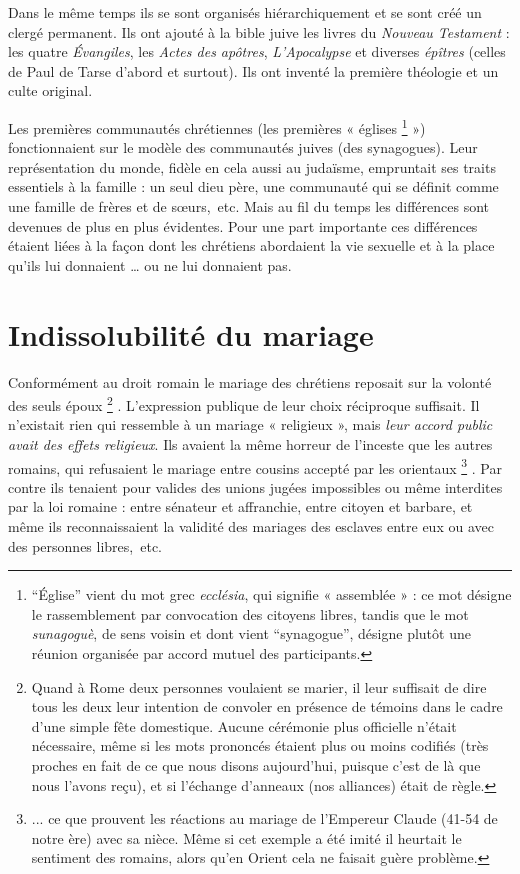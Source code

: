  Dans le même temps ils se sont organisés hiérarchiquement et se sont créé un clergé permanent. Ils ont ajouté à la bible juive les livres du \emph{Nouveau Testament} : les quatre \emph{Évangiles}, les \emph{Actes des apôtres}, \emph{L'Apocalypse} et diverses \emph{épîtres} (celles de Paul de Tarse d'abord et surtout). Ils ont inventé la première théologie et un culte original. 

 Les premières communautés chrétiennes (les premières « églises%
\footnote{\enquote{Église} vient du mot grec \emph{ecclésia}, qui signifie « assemblée » : ce mot désigne le rassemblement par convocation des citoyens libres, tandis que le mot \emph{sunagoguè}, de sens voisin et dont vient \enquote{synagogue}, désigne plutôt une réunion organisée par accord mutuel des participants.}
») fonctionnaient sur le modèle des communautés juives (des synagogues). Leur représentation du monde, fidèle en cela aussi au judaïsme, empruntait ses traits essentiels à la famille : un seul dieu père, une communauté qui se définit comme une famille de frères et de sœurs,~etc. Mais au fil du temps les différences sont devenues de plus en plus évidentes. Pour une part importante ces différences étaient liées à la façon dont les chrétiens abordaient la vie sexuelle et à la place qu'ils lui donnaient … ou ne lui donnaient pas. 


\section{Indissolubilité du mariage}

 Conformément au droit romain le mariage des chrétiens reposait sur la volonté des seuls époux%
\footnote{Quand à Rome deux personnes voulaient se marier, il leur suffisait de dire tous les deux leur intention de convoler en présence de témoins dans le cadre d'une simple fête domestique. Aucune cérémonie plus officielle n'était nécessaire, même si les mots prononcés étaient plus ou moins codifiés (très proches en fait de ce que nous disons aujourd'hui, puisque c'est de là que nous l'avons reçu), et si l'échange d'anneaux (nos alliances) était de règle.}%
. L'expression publique de leur choix réciproque suffisait. Il n'existait rien qui ressemble à un mariage « religieux », mais \emph{leur accord public avait des effets religieux}. Ils avaient la même horreur de l'inceste que les autres romains, qui refusaient le mariage entre cousins accepté par les orientaux%
\footnote{... ce que prouvent les réactions au mariage de l'Empereur Claude (41-54 de notre ère) avec sa nièce. Même si cet exemple a été imité il heurtait le sentiment des romains, alors qu'en Orient cela ne faisait guère problème.}%
. Par contre ils tenaient pour valides des unions jugées impossibles ou même interdites par la loi romaine : entre sénateur et affranchie, entre citoyen et barbare, et même ils reconnaissaient la validité des mariages des esclaves entre eux ou avec des personnes libres,~etc.

